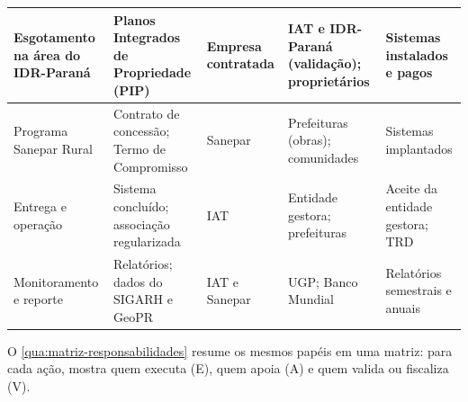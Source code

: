 \begin{quadro}[H]
\begin{tabularx}{\textwidth}{|P{2.7cm}|L|P{2.2cm}|L|L|}
Esgotamento na área do IDR-Paraná & Planos Integrados de Propriedade (PIP) &
  Empresa contratada & IAT e IDR-Paraná (validação); proprietários & Sistemas instalados e pagos \\ \hline
Programa Sanepar Rural & Contrato de concessão; Termo de Compromisso &
  Sanepar & Prefeituras (obras); comunidades & Sistemas implantados \\ \hline
Entrega e operação & Sistema concluído; associação regularizada &
  IAT & Entidade gestora; prefeituras & Aceite da entidade gestora; TRD \\ \hline
Monitoramento e reporte & Relatórios; dados do SIGARH e GeoPR &
  IAT e Sanepar & UGP; Banco Mundial & Relatórios semestrais e anuais \\ \hline
\end{tabularx}
\end{quadro}

O \autoref{qua:matriz-responsabilidades} resume os mesmos papéis em uma matriz:
para cada ação, mostra quem executa (E), quem apoia (A) e quem valida ou
fiscaliza (V).

